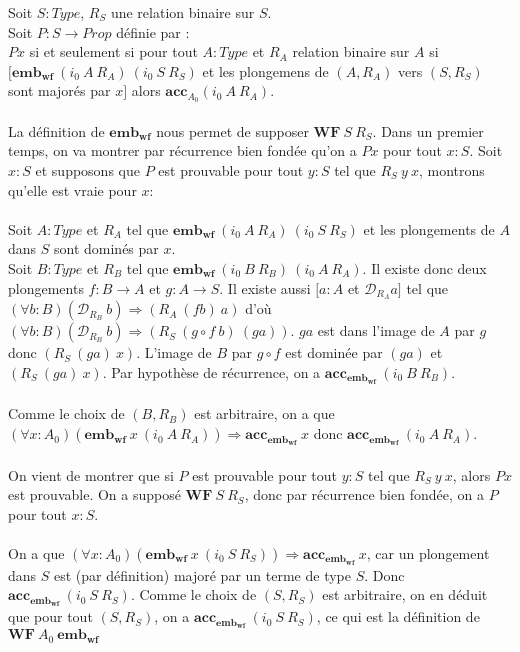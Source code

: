 \documentclass[a4paper,12pt]{article}
\theoremstyle{plain}
\newenvironment{demo}[1][]
 {\if\relax\detokenize{#1}\relax
    \renewcommand\theproofinner{\thetheo}%
  \else
    \renewcommand{\theproofinner}{#1}%
  \fi
  \proofinner}
 {\endproofinner}
\begin{document}
\begin{demo} Soit $S: \mathit{Type}$, $R_S$ une relation binaire sur $S$.\\ 
Soit $P: S \to \mathit{Prop}$ définie par :\\ 
$Px$ si et seulement si pour tout $A: \mathit{Type}$ et $R_A$ relation binaire sur $A$ si \\
$[ \mathbf{{emb}_{wf}}\ (i_0 \ A \ R_A) \ (i_0 \ S \ R_S)$ et les plongemens de $(A, R_A)$ vers $(S, R_S)$ sont majorés par $x]$
alors $\mathbf{acc}_{A_0} (i_0 \ A \ R_A)$.\\
\\ 
La définition de $\mathbf{{emb}_{wf}}$ nous permet de supposer $\mathbf{WF}\ S \ R_S$. Dans un premier temps, on va montrer par récurrence bien fondée qu'on a $Px$ pour tout $x:S$. Soit $x : S$ et supposons que $P$ est prouvable pour tout $y : S$ tel que $R_S \ y \ x$, montrons qu'elle est vraie pour $x$:\\
\\
Soit $A: \mathit{Type}$ et $R_A$ tel que $\mathbf{{emb}_{wf}}\ (i_0 \ A \ R_A) \ (i_0 \ S \ R_S)$ et les plongements de $A$ dans $S$ sont dominés par $x$.\\
Soit $B : \mathit{Type}$ et $R_B$ tel que $\mathbf{{emb}_{wf}}\ (i_0 \ B \ R_B) \ (i_0 \ A \ R_A)$. Il existe donc deux plongements $f: B \to A$ et $g: A \to S$. Il existe aussi $[a:A$ et $\mathcal{D}_{R_A} a]$ tel que $(\forall b:B) (\mathcal{D}_{R_B} \ b) \Rightarrow(R_A \ (fb) \ a)$ d'où $(\forall b:B)(\mathcal{D}_{R_B} \ b) \Rightarrow(R_S \ (g {\circ}f \ b) \ (ga))$. $ga$ est dans l'image de $A$ par $g$ donc $(R_S \ (ga) \ x)$. L'image de $B$ par $g {\circ} f$ est dominée par $(ga)$ et $(R_S \ (ga) \ x)$. Par hypothèse de récurrence, on a $\mathbf{acc}_{\mathbf{{emb}_{wf}}} \ (i_0 \ B \ R_B)$.\\
\\
Comme le choix de $(B,R_B)$ est arbitraire, on a que $(\forall x:A_0) (\mathbf{{emb}_{wf}}\ x \ (i_0 \ A \ R_A)) \Rightarrow\mathbf{acc}_{\mathbf{{emb}_{wf}}}\ x$ donc $\mathbf{acc}_{\mathbf{{emb}_{wf}}} ~(i_0 ~A ~R_A) $.\\ 
\\
On vient de montrer que si $P$ est prouvable pour tout $y : S$ tel que $R_S \ y \ x$, alors $Px$ est prouvable. On a supposé $\mathbf{WF}\ S \ R_S$, donc par récurrence bien fondée, on a $P$ pour tout $x : S$.\\ 
\\ 
On a que $(\forall x:A_0) (\mathbf{{emb}_{wf}}\ x \ (i_0 \ S \ R_S)) \Rightarrow\mathbf{acc}_{\mathbf{{emb}_{wf}}} \ x$, car un plongement dans $S$ est (par définition) majoré par un terme de type $S$. Donc $\mathbf{acc}_{\mathbf{{emb}_{wf}}} \ (i_0 \ S \ R_S)$. Comme le choix de $(S,R_S)$ est arbitraire, on en déduit que pour tout $(S,R_S)$, on a $\mathbf{acc}_{\mathbf{{emb}_{wf}}} \ (i_0 \ S \ R_S)$, ce qui est la définition de $\mathbf{WF}\ A_0 \ \mathbf{{emb}_{wf}}$
\end{demo}
\end{document}
